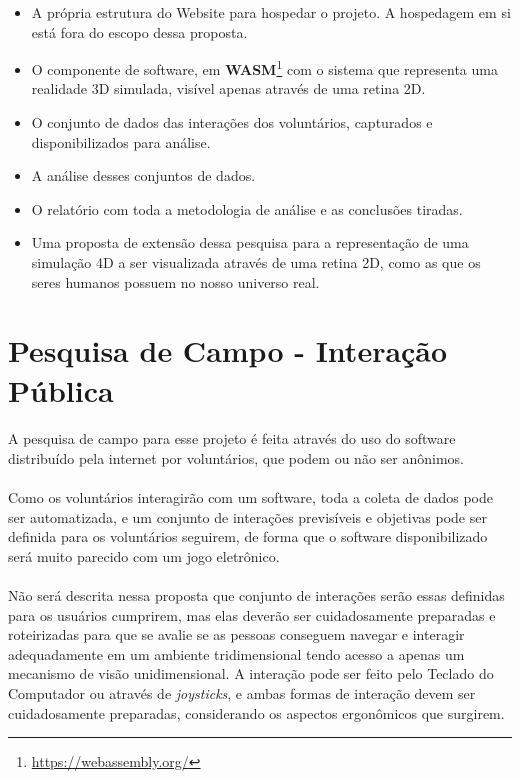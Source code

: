 \documentclass{article}
\begin{document}
	\begin{itemize}
		\item A própria estrutura do Website para hospedar o projeto. A hospedagem em si está fora do escopo dessa proposta.
		\item O componente de software, em \textbf{WASM}\footnote{\url{https://webassembly.org/}} com o sistema que representa uma realidade 3D simulada, visível apenas através de uma retina 2D.
		\item O conjunto de dados das interações dos voluntários, capturados e disponibilizados para análise.
		\item A análise desses conjuntos de dados.
		\item O relatório com toda a metodologia de análise e as conclusões tiradas.
		\item Uma proposta de extensão dessa pesquisa para a representação de uma simulação 4D a ser visualizada através de uma retina 2D, como as que os seres humanos possuem no nosso universo real.
	\end{itemize}
	
	\section{Pesquisa de Campo - Interação Pública} \label{pc}
	\paragraph{}
	A pesquisa de campo para esse projeto é feita através do uso do software distribuído pela internet por voluntários, que podem ou não ser anônimos.
	
	\paragraph{}
	Como os voluntários interagirão com um software, toda a coleta de dados pode ser automatizada, e um conjunto de interações previsíveis e objetivas pode ser definida para os voluntários seguirem, de forma que o software disponibilizado será muito parecido com um jogo eletrônico.
	
	\paragraph{}
	Não será descrita nessa proposta que conjunto de interações serão essas definidas para os usuários cumprirem, mas elas deverão ser cuidadosamente preparadas e roteirizadas para que se avalie se as pessoas conseguem navegar e interagir adequadamente em um ambiente tridimensional tendo acesso a apenas um mecanismo de visão unidimensional. A interação pode ser feito pelo Teclado do Computador ou através de \textit{joysticks}, e ambas formas de interação devem ser cuidadosamente preparadas, considerando os aspectos ergonômicos que surgirem.
	
\end{document}
